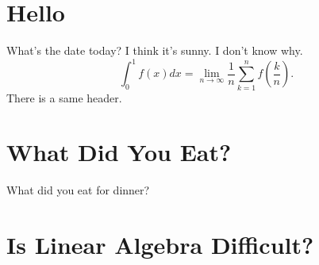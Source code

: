 \documentclass[11pt]{article}
\begin{document}
\section{Hello}
What's the date today? I think it's sunny. I don't know why.
\begin{equation}
  \int_{0}^{1}f(x)dx = \lim_{n \to \infty} \frac{1}{n}\sum_{k=1}^{n} f\left(\frac{k}{n}\right).
\end{equation}
\lipsum[1-5]
\newpage
There is a same header.
\lipsum[2]

\section{What Did You Eat?}
What did you eat for dinner? 
\lipsum[1-3]
\section{Is Linear Algebra Difficult?}
\lipsum[1]
\end{document}
